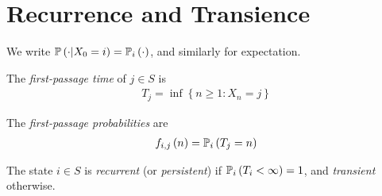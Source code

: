 \documentclass[a4paper]{article}
\begin{document}
\newpage

\section{Recurrence and Transience}
We write $\P\left( \cdot | X_0 = i\right) = \P_i \left(\cdot\right)$, and similarly for expectation.

\begin{defi}
The \emph{first-passage time} of $j \in S$ is
\begin{equation*}
\begin{aligned}
T_j = \inf\left\{n \geq 1: X_n = j\right\}
\end{aligned}
\end{equation*}

The \emph{first-passage probabilities} are
\begin{equation*}
\begin{aligned}
f_{i,j}\left(n\right) = \P_i \left(T_j=n\right)
\end{aligned}
\end{equation*}
\end{defi}

\begin{defi}
The state $i \in S$ is \emph{recurrent} (or \emph{persistent}) if $\P_i\left(T_i < \infty\right) = 1$, and \emph{transient} otherwise.
\end{defi}
\end{document}
